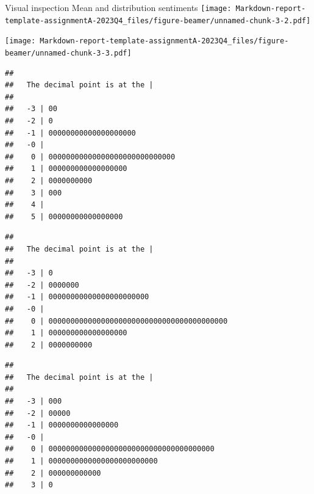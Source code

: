 \documentclass[
  ignorenonframetext,
]{beamer}
\newenvironment{Shaded}{\begin{snugshade}}{\end{snugshade}}
\newcommand{\FunctionTok}[1]{\textcolor[rgb]{0.00,0.00,0.00}{#1}}
\newcommand{\NormalTok}[1]{#1}
\newcommand{\SpecialCharTok}[1]{\textcolor[rgb]{0.00,0.00,0.00}{#1}}
\begin{document}
\begin{frame}[fragile]{Visual inspection Mean and distribution
sentiments}
\texttt{[image: Markdown-report-template-assignmentA-2023Q4\_files/figure-beamer/unnamed-chunk-3-2.pdf]}

\begin{Shaded}
\end{Shaded}

\texttt{[image: Markdown-report-template-assignmentA-2023Q4\_files/figure-beamer/unnamed-chunk-3-3.pdf]}

\begin{Shaded}
\end{Shaded}

\begin{verbatim}
## 
##   The decimal point is at the |
## 
##   -3 | 00
##   -2 | 0
##   -1 | 00000000000000000000
##   -0 | 
##    0 | 00000000000000000000000000000
##    1 | 000000000000000000
##    2 | 0000000000
##    3 | 000
##    4 | 
##    5 | 00000000000000000
\end{verbatim}

\begin{Shaded}
\end{Shaded}

\begin{verbatim}
## 
##   The decimal point is at the |
## 
##   -3 | 0
##   -2 | 0000000
##   -1 | 00000000000000000000000
##   -0 | 
##    0 | 00000000000000000000000000000000000000000
##    1 | 000000000000000000
##    2 | 0000000000
\end{verbatim}

\begin{Shaded}
\end{Shaded}

\begin{verbatim}
## 
##   The decimal point is at the |
## 
##   -3 | 000
##   -2 | 00000
##   -1 | 0000000000000000
##   -0 | 
##    0 | 00000000000000000000000000000000000000
##    1 | 0000000000000000000000000
##    2 | 000000000000
##    3 | 0
\end{verbatim}


\end{frame}
\end{document}
